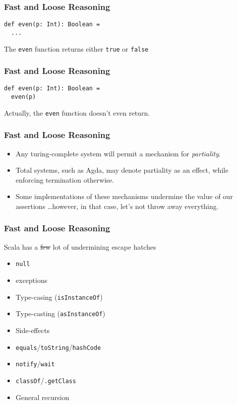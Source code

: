 \begin{frame}[fragile]
\frametitle{Fast and Loose Reasoning}
\begin{lstlisting}[style=scala]
def even(p: Int): Boolean = 
  ...
\end{lstlisting}
\begin{theorem}The \lstinline{even} function returns either \lstinline{true} or \lstinline{false}\end{theorem}
\end{frame}

\begin{frame}[fragile]
\frametitle{Fast and Loose Reasoning}
\begin{lstlisting}[style=scala]
def even(p: Int): Boolean = 
  even(p)
\end{lstlisting}
Actually, the \lstinline{even} function doesn't even return.
\end{frame}

\begin{frame}[fragile]
\frametitle{Fast and Loose Reasoning}
\begin{itemize}
  \item Any turing-complete system will permit a mechanism for \emph{partiality}.
  \item Total systems, such as Agda, may denote partiality as an effect, while enforcing termination otherwise.
  \item Some implementations of these mechanisms undermine the value of our assertions \ldots however, in that case, let's not throw away everything.
\end{itemize}
\end{frame}

\begin{frame}[fragile]
\frametitle{Fast and Loose Reasoning}
\begin{block}{Scala has a \sout{few} lot of undermining escape hatches}
\begin{itemize}
  \item \lstinline{null}
  \item exceptions
  \item Type-casing (\lstinline{isInstanceOf})
  \item Type-casting (\lstinline{asInstanceOf})
  \item Side-effects
  \item \lstinline{equals}/\lstinline{toString}/\lstinline{hashCode}
  \item \lstinline{notify}/\lstinline{wait}
  \item \lstinline{classOf}/\lstinline{.getClass}
  \item General recursion
\end{itemize}
\end{block}
\end{frame}

